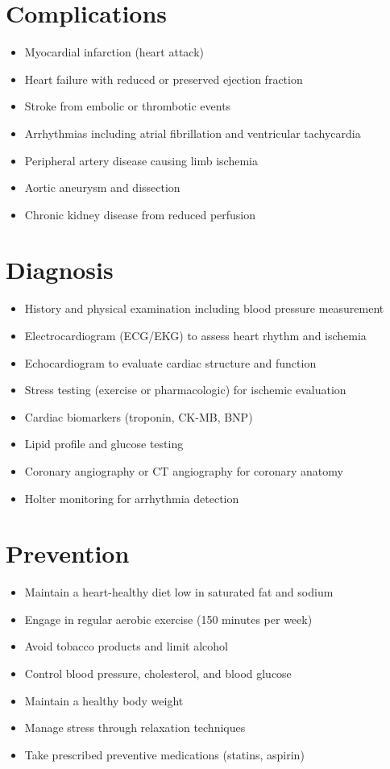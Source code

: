 \section{Complications}

\begin{itemize}[noitemsep]
  \item Myocardial infarction (heart attack)
  \item Heart failure with reduced or preserved ejection fraction
  \item Stroke from embolic or thrombotic events
  \item Arrhythmias including atrial fibrillation and ventricular tachycardia
  \item Peripheral artery disease causing limb ischemia
  \item Aortic aneurysm and dissection
  \item Chronic kidney disease from reduced perfusion
\end{itemize}

\section{Diagnosis}

\begin{itemize}[noitemsep]
  \item History and physical examination including blood pressure measurement
  \item Electrocardiogram (ECG/EKG) to assess heart rhythm and ischemia
  \item Echocardiogram to evaluate cardiac structure and function
  \item Stress testing (exercise or pharmacologic) for ischemic evaluation
  \item Cardiac biomarkers (troponin, CK-MB, BNP)
  \item Lipid profile and glucose testing
  \item Coronary angiography or CT angiography for coronary anatomy
  \item Holter monitoring for arrhythmia detection
\end{itemize}

\section{Prevention}

\begin{itemize}[noitemsep]
  \item Maintain a heart-healthy diet low in saturated fat and sodium
  \item Engage in regular aerobic exercise (150 minutes per week)
  \item Avoid tobacco products and limit alcohol
  \item Control blood pressure, cholesterol, and blood glucose
  \item Maintain a healthy body weight
  \item Manage stress through relaxation techniques
  \item Take prescribed preventive medications (statins, aspirin)
\end{itemize}

